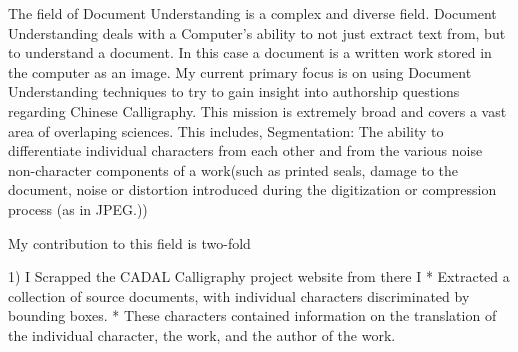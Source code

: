 The field of Document Understanding is a complex and diverse field.  Document Understanding deals with a Computer's ability to not just extract text from, but to understand a document.  In this case a document is a written work stored in the computer as an image.  My current primary focus is on using Document Understanding techniques to try to gain insight into authorship questions regarding Chinese Calligraphy.  This mission is extremely broad and covers a vast area of overlaping sciences.  This includes, Segmentation:  The ability to differentiate individual characters from each other and from the various noise non-character components of a work(such as printed seals, damage to the document, noise or distortion introduced during the digitization or compression process (as in JPEG.))

My contribution to this field is two-fold

1)  I Scrapped the CADAL Calligraphy project website from there I
    *  Extracted a collection of source documents, with individual characters discriminated by bounding boxes.
    *  These characters contained information on the translation of the individual character, the work, and the author of the work.
